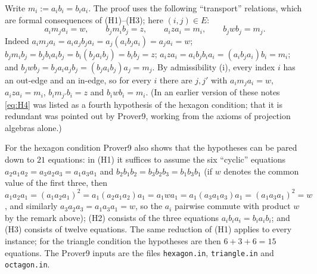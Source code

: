 \documentclass[11pt]{amsart}
\theoremstyle{definition}
\begin{document}
Write $m_i:=a_ib_i=b_ia_i$. The proof uses the following ``transport'' relations, which are formal consequences of (H1)--(H3); here $(i,j)\in E$:
\begin{equation}\label{eq:H4}
a_im_ja_i=w,\qquad b_jm_ib_j=z,\qquad a_iza_i=m_i,\qquad b_jwb_j=m_j .
\end{equation}
Indeed $a_im_ja_i=a_ia_jb_ja_i=a_j(a_ib_ja_i)=a_ja_i=w$; $b_jm_ib_j=b_jb_ia_ib_j=b_i(b_ja_ib_j)=b_ib_j=z$; $a_iza_i=a_ib_jb_ia_i=(a_ib_ja_i)b_i=m_i$; and $b_jwb_j=b_ja_ia_jb_j=(b_ja_ib_j)a_j=m_j$. By admissibility (i), every index $i$ has an out-edge and an in-edge, so for every $i$ there are $j,j'$ with $a_im_ja_i=w$, $a_iza_i=m_i$, $b_im_{j'}b_i=z$ and $b_iwb_i=m_i$. (In an earlier version of these notes \eqref{eq:H4} was listed as a fourth hypothesis of the hexagon condition; that it is redundant was pointed out by Prover9, working from the axioms of projection algebras alone.)

For the hexagon condition Prover9 also shows that the hypotheses can be pared down to $21$ equations: in (H1) it suffices to assume the six ``cyclic'' equations $a_2a_1a_2=a_3a_2a_3=a_1a_3a_1$ and $b_2b_1b_2=b_3b_2b_3=b_1b_3b_1$ (if $w$ denotes the common value of the first three, then $a_1a_2a_1=(a_1a_2a_1)^2=a_1(a_2a_1a_2)a_1=a_1wa_1=a_1(a_3a_1a_3)a_1=(a_1a_3a_1)^2=w$, and similarly $a_3a_2a_3=a_1a_3a_1=w$, so the $a_i$ pairwise commute with product $w$ by the remark above); (H2) consists of the three equations $a_ib_ia_i=b_ia_ib_i$; and (H3) consists of twelve equations. The same reduction of (H1) applies to every instance; for the triangle condition the hypotheses are then $6+3+6=15$ equations. The Prover9 inputs are the files \texttt{hexagon.in}, \texttt{triangle.in} and \texttt{octagon.in}.
\end{document}

